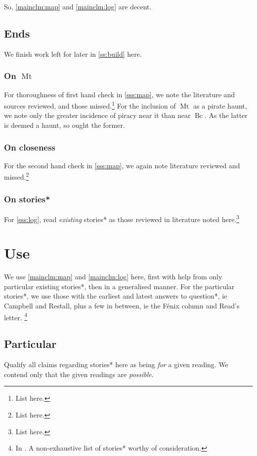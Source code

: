 \documentclass{amsart}
\newcommand{\mention}[1]{\textit{#1}}%
\DeclareMathOperator{\mt}{Mt}%
\DeclareMathOperator{\bc}{Bc}%
\theoremstyle{definition}
\theoremstyle{remark}
\begin{document}
		So, \ref{mainclm:map} and \ref{mainclm:log} are decent.
	\subsection{Ends}
		\label{ss:ends}
		We finish work left for later in \ref{ss:build} here.
		\subsubsection{On \(\mt\)}
		\label{sss:onmt}
		For thoroughness of first hand check in \ref{sss:map}, we note the literature and sources reviewed, and those missed.\footnote{List here.} For the inclusion of \(\mt\) as a pirate haunt, we note only the greater incidence of piracy near it than near \(\bc\). As the latter is deemed a haunt, so ought the former.
		\subsubsection{On closeness}
		\label{sss:oncloseness}
		For the second hand check in \ref{sss:map}, we again note literature reviewed and missed.\footnote{List here.}
		\subsubsection{On stories*}
		\label{sss:onstories}
		For \ref{sss:log}, read \mention{existing} stories* as those reviewed in literature noted here.\footnote{List here.}
%
%
%
%
\section{Use}
	\label{s:use}
	We use \ref{mainclm:map} and \ref{mainclm:log} here, first with help from only particular existing stories*, then in a generalised manner. For the particular stories*, we use those with the earliest and latest answers to question*, ie Campbell and Restall, plus a few in between, ie the Fénix column and Read's letter. \footnote{In . A non-exhaustive list of stories* worthy of consideration.}
	\subsection{Particular}
		\label{ss:particular}
		Qualify all claims regarding stories* here as being \emph{for} a given reading. We contend only that the given readings are \emph{possible}.
\end{document}
